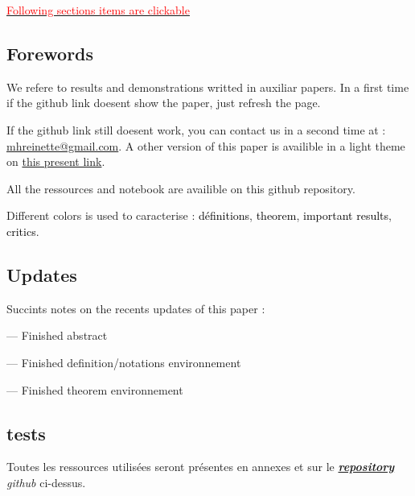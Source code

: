 \documentclass[10pt,a4paper]{article}
\newcommand{\linkk}[2]{\href{#2}{\textcolor{urlcolor}{#1}}}
\newenvironment{para}
	{
	\begin{center}
	\begin{minipage}[r]{0.1\textwidth}
	\phantom{aaaa}
	
	\end{minipage}
	\begin{minipage}[r]{0.89\textwidth}
	
	}{
	
	\phantom{aaaaaaa}
	\end{minipage}
	\end{center}
	}
\begin{document}
\begin{para}
\begin{center}
\hyperlink{ref1}{\colorbox{souligne}{\textcolor{red}{\hypertarget{ref1}{Following sections items are clickable}}}}
\end{center}
\end{para}


\subsection{Forewords}
\begin{para}
We refere to results and demonstrations writted in auxiliar papers. 
In a first time if the github link doesent show the paper, just refresh the page.

\phantom{aaaaaa}

If the github link still doesent work, you can contact us in a second time at : \linkk{mhreinette@gmail.com}{mailto:mhreinette@gmail.com}.
A other version of this paper is availible in a light theme on \linkk{this present link}{mailto:mhreinette@gmail.com}.

\phantom{aaaaaa}

All the ressources and notebook are availible on this github repository.

Different colors is used to caracterise : \colorbox{letcolor}{\textcolor{black}{définitions}}, \colorbox{theocolor}{\textcolor{black}{theorem}}, \colorbox{rescolor}{\textcolor{black}{important results}}, \colorbox{red!60}{\textcolor{black}{crit}}\colorbox{green!60}{\textcolor{black}{ics}}.
\end{para}




\subsection{Updates}
\begin{para}
Succints notes on the recents updates of this paper : 

— Finished abstract

— Finished definition/notations environnement

— Finished theorem environnement


\end{para}




\subsection{tests}
\begin{para}
Toutes les ressources utilisées seront présentes en annexes et sur le \href{https://github.com/LaboiteNoire/TER.git}{\textit{\textbf{repository}}} \textit{github} ci-dessus.
\end{para}
\end{document}
